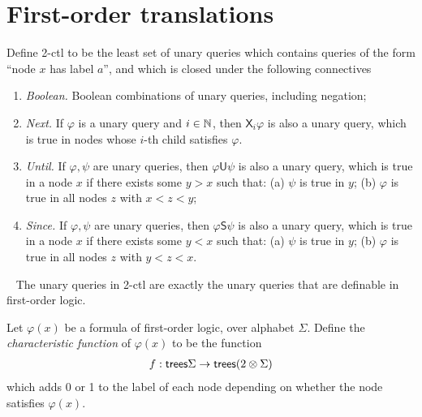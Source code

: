 \section{First-order translations}\label{sec:fo-translation}




\newcommand{\nextmod}{\mathsf X}
\newcommand{\untilmod}{\mathsf U}
\newcommand{\sincemod}{\mathsf S}


\begin{definition}[2-ctl]
    Define 2-ctl to be the least set of unary queries which contains queries of the form ``node $x$ has label $a$'', and which is closed under the following connectives
    \begin{enumerate}
        \item \emph{Boolean.} Boolean combinations of unary queries, including negation;
        \item \emph{Next.} If $\varphi$ is a unary query and $i \in {\mathbb N}$, then  $\nextmod_i \varphi$ is also a unary query, which is true in nodes whose $i$-th child satisfies $\varphi$.
         \item \emph{Until.} If $\varphi,\psi$ are  unary queries, then  $\varphi \untilmod \psi$ is also a unary query, which is true in a node $x$ if there exists some $y > x$ such that: (a) $\psi$ is true in $y$; (b) $\varphi$ is true in all nodes $z$ with $x < z < y$;
         \item \emph{Since.} If $\varphi,\psi$ are  unary queries, then  $\varphi \sincemod \psi$ is also a unary query, which is true in a node $x$ if there exists some $y < x$ such that: (a) $\psi$ is true in $y$; (b) $\varphi$ is true in all nodes $z$ with $y < z < x$.
    \end{enumerate}
\end{definition}
\begin{theorem}~\cite[Theorem 2.6]{schlingloff1992expressive} \label{thm:ctl} The unary queries in 2-ctl are exactly the unary queries that are definable in first-order logic.
\end{theorem}

\begin{definition}\label{def:characteristic}
    Let $\varphi(x)$ be a formula of first-order logic, over alphabet $\Sigma$. Define the \emph{characteristic function} of $\varphi(x)$ to be the function
            \begin{align*}
                f : \mathsf {trees} \Sigma \to \mathsf {trees} (2 \otimes \Sigma)
            \end{align*}
            which adds 0 or 1 to  the label of each node depending on whether the node satisfies $\varphi(x)$.
\end{definition}


